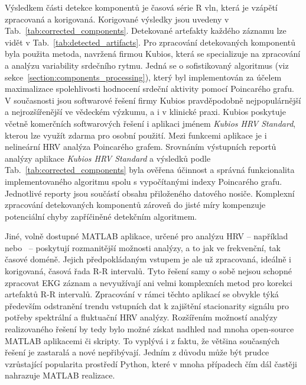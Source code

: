 Výsledkem části detekce komponentů je časová série R vln, která je vzápětí
zpracovaná a korigovaná. Korigované výsledky jsou uvedeny v
Tab.~\ref{tab:corrected_components}. Detekované artefakty každého záznamu lze
vidět v Tab.~\ref{tab:detected_artifacts}. Pro zpracování detekovaných
komponentů byla použita metoda, navržená firmou Kubios, která se specializuje na
zpracování a analýzu variability srdečního rytmu. Jedná se o sofistikovaný
algoritmus (viz sekce~\ref{section:components_processing}), který byl
implementován za účelem maximalizace spolehlivosti hodnocení srdeční aktivity
pomocí Poincarého grafu. V současnosti jsou softwarové řešení firmy Kubios
pravděpodobně nejpopulárnější a nejrozšířenější ve vědeckém výzkumu, a i v
klinické praxi. Kubios poskytuje včetně komerčních softwarových řešení i
aplikaci jménem \textit{Kubios HRV Standard}, kterou lze využít zdarma pro
osobní použití. Mezi funkcemi aplikace je i nelineární HRV analýza Poincarého
grafem. Srovnáním výstupních reportů analýzy aplikace \textit{Kubios HRV
    Standard} a výsledků podle Tab.~\ref{tab:corrected_components} byla ověřena
účinnost a správná funkcionalita implementovaného algoritmu spolu s vypočítanými
indexy Poincarého grafu. Jednotlivé reporty jsou součástí obsahu přiloženého
datového nosiče. Komplexní zpracování detekovaných komponentů zároveň do jisté
míry kompenzuje potenciální chyby zapříčiněné detekčním algoritmem.

Jiné, volně dostupné MATLAB aplikace, určené pro analýzu HRV --
například~\cite{Ramshur2010} nebo~\cite{Kardia2010} -- poskytují rozmanitější
možnosti analýzy, a to jak ve frekvenční, tak časové doméně. Jejich
předpokládaným vstupem je ale už zpracovaná, ideálně i korigovaná, časová řada
R-R intervalů. Tyto řešení samy o sobě nejsou schopné zpracovat EKG záznam a
nevyužívají ani velmi komplexních metod pro korekci artefaktů R-R intervalů.
Zpracování v rámci těchto aplikací se obvykle týká především odstranění trendu
vstupních dat k zajištění stacionarity signálu pro potřeby spektrální a
fluktuační HRV analýzy. Rozšířením možností analýzy realizovaného řešení by tedy
bylo možné získat nadhled nad mnoha open-source MATLAB aplikacemi či skripty. To
vyplývá i z faktu, že většina současných řešení je zastaralá a nové nepřibývají.
Jedním z důvodu může být prudce vzrůstající popularita prostředí Python, které v
mnoha případech čím dál častěji nahrazuje MATLAB realizace.

